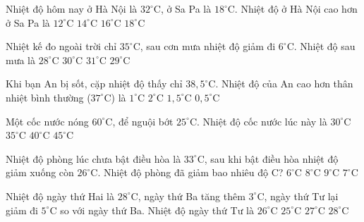 \begin{ex} %
Nhiệt độ hôm nay ở Hà Nội là $32^\circ\text{C}$, ở Sa Pa là $18^\circ\text{C}$. Nhiệt độ ở Hà Nội cao hơn ở Sa Pa là
\choice
{$12^\circ\text{C}$}
{\True $14^\circ\text{C}$}
{$16^\circ\text{C}$}
{$18^\circ\text{C}$}
\end{ex}

\begin{ex} %
Nhiệt kế đo ngoài trời chỉ $35^\circ\text{C}$, sau cơn mưa nhiệt độ giảm đi $6^\circ\text{C}$. Nhiệt độ sau mưa là
\choice
{$28^\circ\text{C}$}
{$30^\circ\text{C}$}
{$31^\circ\text{C}$}
{\True $29^\circ\text{C}$}
\end{ex}

\begin{ex} %
Khi bạn An bị sốt, cặp nhiệt độ thấy chỉ $38{,}5^\circ\text{C}$. Nhiệt độ của An cao hơn thân nhiệt bình thường ($37^\circ\text{C}$) là
\choice
{$1^\circ\text{C}$}
{$2^\circ\text{C}$}
{\True $1{,}5^\circ\text{C}$}
{$0{,}5^\circ\text{C}$}
\end{ex}

\begin{ex} %
Một cốc nước nóng $60^\circ\text{C}$, để nguội bớt $25^\circ\text{C}$. Nhiệt độ cốc nước lúc này là
\choice
{$30^\circ\text{C}$}
{\True $35^\circ\text{C}$}
{$40^\circ\text{C}$}
{$45^\circ\text{C}$}
\end{ex}

\begin{ex} %
Nhiệt độ phòng lúc chưa bật điều hòa là $33^\circ\text{C}$, sau khi bật điều hòa nhiệt độ giảm xuống còn $26^\circ\text{C}$. Nhiệt độ phòng đã giảm bao nhiêu độ C?
\choice
{$6^\circ\text{C}$}
{$8^\circ\text{C}$}
{$9^\circ\text{C}$}
{\True $7^\circ\text{C}$}
\end{ex}

\begin{ex} %
Nhiệt độ ngày thứ Hai là $28^\circ\text{C}$, ngày thứ Ba tăng thêm $3^\circ\text{C}$, ngày thứ Tư lại giảm đi $5^\circ\text{C}$ so với ngày thứ Ba. Nhiệt độ ngày thứ Tư là
\choice
{\True $26^\circ\text{C}$}
{$25^\circ\text{C}$}
{$27^\circ\text{C}$}
{$28^\circ\text{C}$}
\end{ex}

